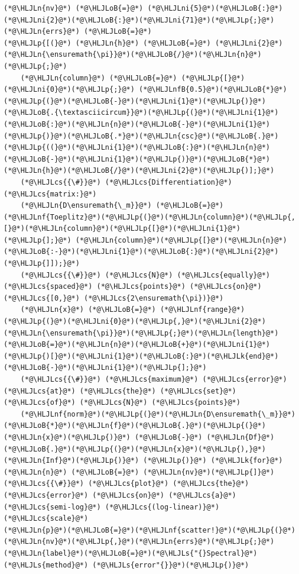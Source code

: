 \documentclass[12pt,a4paper]{article}
\newcommand{\HLJLk}[1]{\textcolor[RGB]{148,91,176}{\textbf{#1}}}
\newcommand{\HLJLn}[1]{#1}
\newcommand{\HLJLnf}[1]{\textcolor[RGB]{66,102,213}{#1}}
\newcommand{\HLJLs}[1]{\textcolor[RGB]{201,61,57}{#1}}
\newcommand{\HLJLnfB}[1]{\textcolor[RGB]{59,151,46}{#1}}
\newcommand{\HLJLni}[1]{\textcolor[RGB]{59,151,46}{#1}}
\newcommand{\HLJLoB}[1]{\textcolor[RGB]{102,102,102}{\textbf{#1}}}
\newcommand{\HLJLp}[1]{#1}
\newcommand{\HLJLcs}[1]{\textcolor[RGB]{153,153,119}{\textit{#1}}}
\begin{document}
\begin{lstlisting}
(*@\HLJLn{nv}@*) (*@\HLJLoB{=}@*) (*@\HLJLni{5}@*)(*@\HLJLoB{:}@*)(*@\HLJLni{2}@*)(*@\HLJLoB{:}@*)(*@\HLJLni{71}@*)(*@\HLJLp{;}@*)
(*@\HLJLn{errs}@*) (*@\HLJLoB{=}@*) 
(*@\HLJLp{[(}@*) (*@\HLJLn{h}@*) (*@\HLJLoB{=}@*) (*@\HLJLni{2}@*)(*@\HLJLn{\ensuremath{\pi}}@*)(*@\HLJLoB{/}@*)(*@\HLJLn{n}@*)(*@\HLJLp{;}@*)
    (*@\HLJLn{column}@*) (*@\HLJLoB{=}@*) (*@\HLJLp{[}@*)(*@\HLJLni{0}@*)(*@\HLJLp{;}@*) (*@\HLJLnfB{0.5}@*)(*@\HLJLoB{*}@*)(*@\HLJLp{(}@*)(*@\HLJLoB{-}@*)(*@\HLJLni{1}@*)(*@\HLJLp{)}@*)(*@\HLJLoB{.{\textasciicircum}}@*)(*@\HLJLp{(}@*)(*@\HLJLni{1}@*)(*@\HLJLoB{:}@*)(*@\HLJLn{n}@*)(*@\HLJLoB{-}@*)(*@\HLJLni{1}@*)(*@\HLJLp{)}@*)(*@\HLJLoB{.*}@*)(*@\HLJLn{csc}@*)(*@\HLJLoB{.}@*)(*@\HLJLp{((}@*)(*@\HLJLni{1}@*)(*@\HLJLoB{:}@*)(*@\HLJLn{n}@*)(*@\HLJLoB{-}@*)(*@\HLJLni{1}@*)(*@\HLJLp{)}@*)(*@\HLJLoB{*}@*)(*@\HLJLn{h}@*)(*@\HLJLoB{/}@*)(*@\HLJLni{2}@*)(*@\HLJLp{)];}@*)
    (*@\HLJLcs{{\#}}@*) (*@\HLJLcs{Differentiation}@*) (*@\HLJLcs{matrix:}@*)
    (*@\HLJLn{D\ensuremath{\_m}}@*) (*@\HLJLoB{=}@*) (*@\HLJLnf{Toeplitz}@*)(*@\HLJLp{(}@*)(*@\HLJLn{column}@*)(*@\HLJLp{,[}@*)(*@\HLJLn{column}@*)(*@\HLJLp{[}@*)(*@\HLJLni{1}@*)(*@\HLJLp{];}@*) (*@\HLJLn{column}@*)(*@\HLJLp{[}@*)(*@\HLJLn{n}@*)(*@\HLJLoB{:-}@*)(*@\HLJLni{1}@*)(*@\HLJLoB{:}@*)(*@\HLJLni{2}@*)(*@\HLJLp{]]);}@*)
    (*@\HLJLcs{{\#}}@*) (*@\HLJLcs{N}@*) (*@\HLJLcs{equally}@*) (*@\HLJLcs{spaced}@*) (*@\HLJLcs{points}@*) (*@\HLJLcs{on}@*) (*@\HLJLcs{[0,}@*) (*@\HLJLcs{2\ensuremath{\pi})}@*)
    (*@\HLJLn{x}@*) (*@\HLJLoB{=}@*) (*@\HLJLnf{range}@*)(*@\HLJLp{(}@*)(*@\HLJLni{0}@*)(*@\HLJLp{,}@*)(*@\HLJLni{2}@*)(*@\HLJLn{\ensuremath{\pi}}@*)(*@\HLJLp{;}@*)(*@\HLJLn{length}@*)(*@\HLJLoB{=}@*)(*@\HLJLn{n}@*)(*@\HLJLoB{+}@*)(*@\HLJLni{1}@*)(*@\HLJLp{)[}@*)(*@\HLJLni{1}@*)(*@\HLJLoB{:}@*)(*@\HLJLk{end}@*)(*@\HLJLoB{-}@*)(*@\HLJLni{1}@*)(*@\HLJLp{];}@*)
    (*@\HLJLcs{{\#}}@*) (*@\HLJLcs{maximum}@*) (*@\HLJLcs{error}@*) (*@\HLJLcs{at}@*) (*@\HLJLcs{the}@*) (*@\HLJLcs{set}@*) (*@\HLJLcs{of}@*) (*@\HLJLcs{N}@*) (*@\HLJLcs{points}@*)
    (*@\HLJLnf{norm}@*)(*@\HLJLp{(}@*)(*@\HLJLn{D\ensuremath{\_m}}@*)(*@\HLJLoB{*}@*)(*@\HLJLn{f}@*)(*@\HLJLoB{.}@*)(*@\HLJLp{(}@*)(*@\HLJLn{x}@*)(*@\HLJLp{)}@*) (*@\HLJLoB{-}@*) (*@\HLJLn{Df}@*)(*@\HLJLoB{.}@*)(*@\HLJLp{(}@*)(*@\HLJLn{x}@*)(*@\HLJLp{),}@*)(*@\HLJLn{Inf}@*)(*@\HLJLp{)}@*) (*@\HLJLp{)}@*) (*@\HLJLk{for}@*) (*@\HLJLn{n}@*) (*@\HLJLoB{=}@*) (*@\HLJLn{nv}@*)(*@\HLJLp{]}@*)
(*@\HLJLcs{{\#}}@*) (*@\HLJLcs{plot}@*) (*@\HLJLcs{the}@*) (*@\HLJLcs{error}@*) (*@\HLJLcs{on}@*) (*@\HLJLcs{a}@*) (*@\HLJLcs{semi-log}@*) (*@\HLJLcs{(log-linear)}@*) (*@\HLJLcs{scale}@*)
(*@\HLJLn{p}@*)(*@\HLJLoB{=}@*)(*@\HLJLnf{scatter!}@*)(*@\HLJLp{(}@*)(*@\HLJLn{nv}@*)(*@\HLJLp{,}@*)(*@\HLJLn{errs}@*)(*@\HLJLp{;}@*)(*@\HLJLn{label}@*)(*@\HLJLoB{=}@*)(*@\HLJLs{"{}Spectral}@*) (*@\HLJLs{method}@*) (*@\HLJLs{error"{}}@*)(*@\HLJLp{)}@*)
\end{lstlisting}
\end{document}
